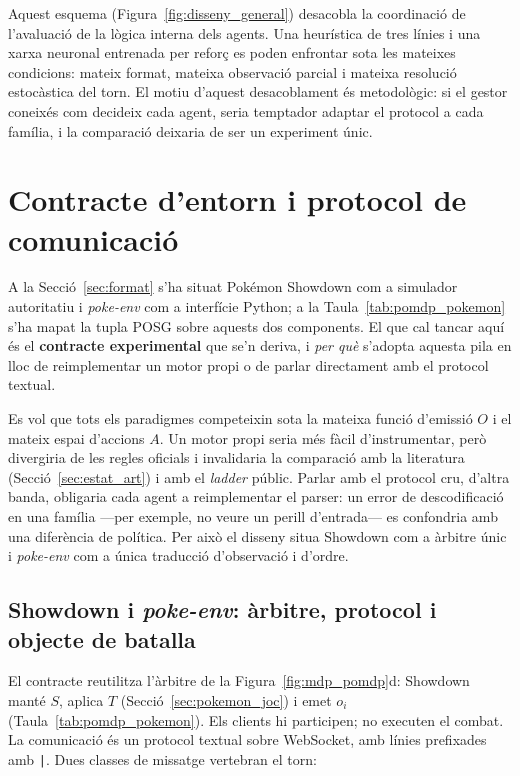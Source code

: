 Aquest esquema (Figura~\ref{fig:disseny_general}) desacobla la coordinació de l'avaluació de la lògica interna dels agents. Una heurística de tres línies i una xarxa neuronal entrenada per reforç es poden enfrontar sota les mateixes condicions: mateix format, mateixa observació parcial i mateixa resolució estocàstica del torn. El motiu d'aquest desacoblament és metodològic: si el gestor coneixés com decideix cada agent, seria temptador adaptar el protocol a cada família, i la comparació deixaria de ser un experiment únic.

\section{Contracte d'entorn i protocol de comunicació}
\label{sec:pila_tecnologica}

A la Secció~\ref{sec:format} s'ha situat Pokémon Showdown com a simulador autoritatiu i \textit{poke-env} com a interfície Python; a la Taula~\ref{tab:pomdp_pokemon} s'ha mapat la tupla POSG sobre aquests dos components. El que cal tancar aquí és el \textbf{contracte experimental} que se'n deriva, i \emph{per què} s'adopta aquesta pila en lloc de reimplementar un motor propi o de parlar directament amb el protocol textual.

Es vol que tots els paradigmes competeixin sota la mateixa funció d'emissió $O$ i el mateix espai d'accions $A$. Un motor propi seria més fàcil d'instrumentar, però divergiria de les regles oficials i invalidaria la comparació amb la literatura (Secció~\ref{sec:estat_art}) i amb el \emph{ladder} públic. Parlar amb el protocol cru, d'altra banda, obligaria cada agent a reimplementar el parser: un error de descodificació en una família ---per exemple, no veure un perill d'entrada--- es confondria amb una diferència de política. Per això el disseny situa Showdown com a àrbitre únic i \textit{poke-env} com a única traducció d'observació i d'ordre.

\subsection{Showdown i \textit{poke-env}: àrbitre, protocol i objecte de batalla}
\label{subsec:showdown_pokeenv}

El contracte reutilitza l'àrbitre de la Figura~\ref{fig:mdp_pomdp}d: Showdown~\cite{pokemon_showdown} manté $S$, aplica $T$ (Secció~\ref{sec:pokemon_joc}) i emet $o_i$ (Taula~\ref{tab:pomdp_pokemon}). Els clients hi participen; no executen el combat. La comunicació és un protocol textual sobre WebSocket, amb línies prefixades amb \texttt{|}. Dues classes de missatge vertebran el torn:

